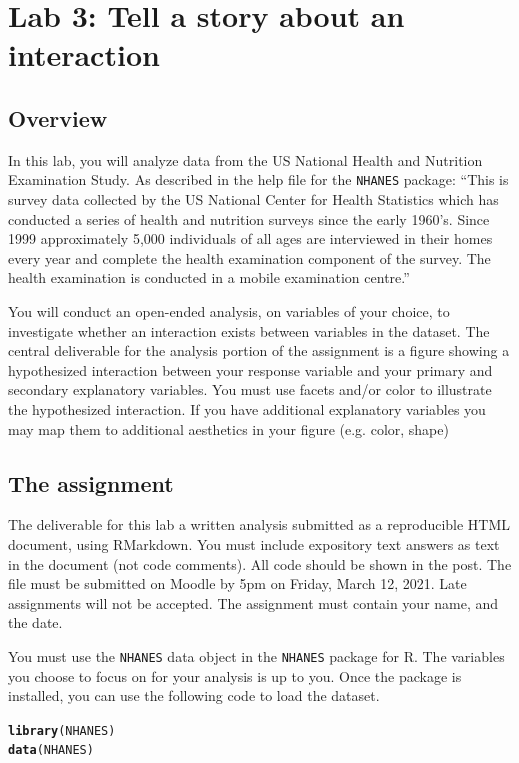 \documentclass{article}\usepackage[]{graphicx}\usepackage[]{color}
\makeatletter
\newcommand{\hlstd}[1]{\textcolor[rgb]{0.345,0.345,0.345}{#1}}%
\newcommand{\hlkwd}[1]{\textcolor[rgb]{0.737,0.353,0.396}{\textbf{#1}}}%
\newenvironment{kframe}{%
 \def\at@end@of@kframe{}%
 \ifinner\ifhmode%
  \def\at@end@of@kframe{\end{minipage}}%
  \begin{minipage}{\columnwidth}%
 \fi\fi%
 \def\FrameCommand##1{\hskip\@totalleftmargin \hskip-\fboxsep
 \colorbox{shadecolor}{##1}\hskip-\fboxsep
     \hskip-\linewidth \hskip-\@totalleftmargin \hskip\columnwidth}%
 \MakeFramed {\advance\hsize-\width
   \@totalleftmargin\z@ \linewidth\hsize
   \@setminipage}}%
 {\par\unskip\endMakeFramed%
 \at@end@of@kframe}
\newenvironment{knitrout}{}{} %
\makeatother
\begin{document}

\section*{Lab 3: Tell a story about an interaction}

\subsection*{Overview}

In this lab, you will analyze data from the US National Health and Nutrition Examination Study. As described in the help file for the {\tt NHANES} package:
``This is survey data collected by the US National Center for Health Statistics which has conducted a series of health and nutrition surveys since the early 1960's. Since 1999 approximately 5,000 individuals of all ages are interviewed in their homes every year and complete the health examination component of the survey. The health examination is conducted in a mobile examination centre.''

You will conduct an open-ended analysis, on variables of your choice, to investigate whether an interaction exists between variables in the dataset. The central deliverable for the analysis portion of the assignment is a figure showing a hypothesized interaction between your response variable and your primary and secondary explanatory variables. You must use facets and/or color to illustrate the hypothesized interaction. If you have additional explanatory variables you may map them to additional aesthetics in your figure (e.g. color, shape)

\subsection*{The assignment}
The deliverable for this lab a written analysis submitted as a reproducible HTML document, using RMarkdown. You must include expository text answers as text in the document (not code comments). All code should be shown in the post. The file must be submitted on Moodle by 5pm on Friday, March 12, 2021. Late assignments will not be accepted. The assignment must contain your name, and the date.

You must use the {\tt NHANES} data object in the {\tt NHANES} package for R. The variables you choose to focus on for your analysis is up to you. Once the package is installed, you can use the following code to load the dataset.
\begin{knitrout}
\color{fgcolor}\begin{kframe}
\begin{alltt}
\hlkwd{library}\hlstd{(NHANES)}
\hlkwd{data}\hlstd{(NHANES)}
\end{alltt}
\end{kframe}
\end{knitrout}
\end{document}
